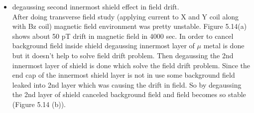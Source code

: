 \begin{itemize}
   \item degaussing second innermost shield effect in field drift.\\
   After doing transverse field study (applying current to X and Y coil along with Bz coil) magnetic field environment was pretty unstable. Figure 5.14(a) shows about 50 pT drift in magnetic field in 4000 sec. In order to cancel background field inside shield degaussing innermost layer of $\mu$ metal is done but it doesn't help to solve field drift problem. Then degaussing the 2nd innermost layer of shield is done which solve the field drift problem. Since the end cap of the innermost shield layer is not in use some background field leaked into 2nd layer which was causing the drift in field. So by degaussing the 2nd layer of shield canceled background field and field becomes so stable (Figure 5.14 (b)).
   
  \begin{figure}
    \centering
 

\end{figure}
\end{itemize}
